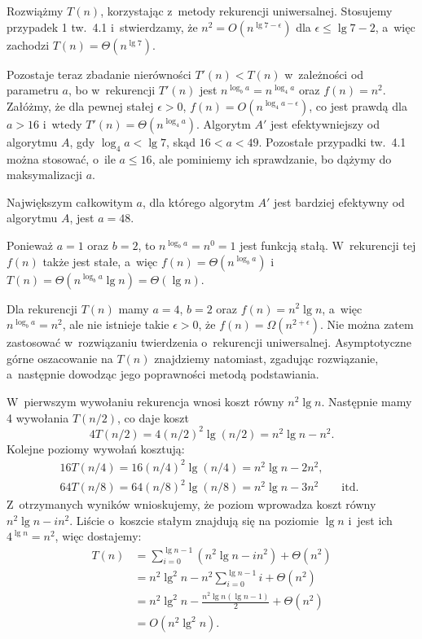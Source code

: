 \exercise %
Rozwiążmy $T(n)$, korzystając z~metody rekurencji uniwersalnej.
Stosujemy przypadek 1 tw.\ 4.1 i~stwierdzamy, że $n^2=O(n^{\lg7-\epsilon})$ dla $\epsilon\le\lg7-2$, a~więc zachodzi $T(n)=\Theta(n^{\lg7})$.

Pozostaje teraz zbadanie nierówności $T'(n)<T(n)$ w~zależności od parametru $a$, bo w~rekurencji $T'(n)$ jest $n^{\log_ba}=n^{\log_4a}$ oraz $f(n)=n^2$.
Załóżmy, że dla pewnej stałej $\epsilon>0$, $f(n)=O(n^{\log_4a-\epsilon})$, co jest prawdą dla $a>16$ i~wtedy $T'(n)=\Theta(n^{\log_4a})$.
Algorytm $A'$ jest efektywniejszy od algorytmu $A$, gdy $\log_4a<\lg7$, skąd $16<a<49$.
Pozostałe przypadki tw.\ 4.1 można stosować, o~ile $a\le16$, ale pominiemy ich sprawdzanie, bo dążymy do maksymalizacji $a$.

Największym całkowitym $a$, dla którego algorytm $A'$ jest bardziej efektywny od algorytmu $A$, jest $a=48$.

\exercise %
Ponieważ $a=1$ oraz $b=2$, to $n^{\log_ba}=n^0=1$ jest funkcją stałą.
W~rekurencji tej $f(n)$ także jest stałe, a~więc $f(n)=\Theta(n^{\log_ba})$ i~$T(n)=\Theta(n^{\log_ba}\lg n)=\Theta(\lg n)$.

\exercise %
Dla rekurencji $T(n)$ mamy $a=4$, $b=2$ oraz $f(n)=n^2\lg n$, a~więc $n^{\log_ba}=n^2$, ale nie istnieje takie $\epsilon>0$, że $f(n)=\Omega(n^{2+\epsilon})$.
Nie można zatem zastosować w~rozwiązaniu twierdzenia o~rekurencji uniwersalnej.
Asymptotyczne górne oszacowanie na $T(n)$ znajdziemy natomiast, zgadując rozwiązanie, a~następnie dowodząc jego poprawności metodą podstawiania.

W~pierwszym wywołaniu rekurencja wnosi koszt równy $n^2\lg n$.
Następnie mamy 4 wywołania $T(n/2)$, co daje koszt
\[
	4T(n/2) = 4(n/2)^2\lg(n/2) = n^2\lg n-n^2.
\]
Kolejne poziomy wywołań kosztują:
\begin{gather*}
	16T(n/4) = 16(n/4)^2\lg(n/4) = n^2\lg n-2n^2, \qquad\phantom{\text{itd.}} \\
	64T(n/8) = 64(n/8)^2\lg(n/8) = n^2\lg n-3n^2 \qquad\text{itd.}
\end{gather*}
Z~otrzymanych wyników wnioskujemy, że  poziom wprowadza koszt równy $n^2\lg n-in^2$.
Liście o~koszcie stałym znajdują się na poziomie $\lg n$ i~jest ich $4^{\lg n}=n^2$, więc dostajemy:
\begin{align*}
	T(n) &= \sum_{i=0}^{\lg n-1}(n^2\lg n-in^2)+\Theta(n^2) \\
	&= n^2\lg^2n-n^2\sum_{i=0}^{\lg n-1}i+\Theta(n^2) \\[1mm]
	&= n^2\lg^2n-\frac{n^2\lg n(\lg n-1)}{2}+\Theta(n^2) \\[1mm]
	&= O(n^2\lg^2n).
\end{align*}

